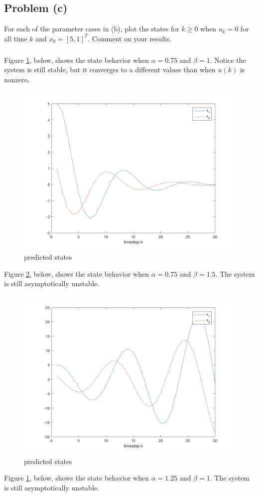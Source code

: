 \documentclass[11pt]{article}
\begin{document}
\subsection*{Problem (c)}
For each of the parameter cases in (b), plot the states for $k\geq0$ when $u_k=0$ for all time $k$ and $x_0=[5,1]^T$. Comment on your results.

\subparagraph*{}
Figure \ref{fig:2c_plot1}, below, shows the state behavior when $\alpha=0.75$ and $\beta=1$. Notice the system is still stable, but it converges to a different values than when $u(k)$ is nonzero.

\begin{figure}[h!]
	\centering
	\includegraphics[width=0.6\linewidth]{2c_plot1.png}
	\caption{predicted states}
	\label{fig:2c_plot1}
\end{figure}

Figure \ref{fig:2c_plot2}, below, shows the state behavior when $\alpha=0.75$ and $\beta=1.5$. The system is still asymptotically unstable.

\begin{figure}[h!]
	\centering
	\includegraphics[width=0.6\linewidth]{2c_plot2.png}
	\caption{predicted states}
	\label{fig:2c_plot2}
\end{figure}

Figure \ref{fig:2c_plot1}, below, shows the state behavior when $\alpha=1.25$ and $\beta=1$. The system is still asymptotically unstable.
\end{document}
